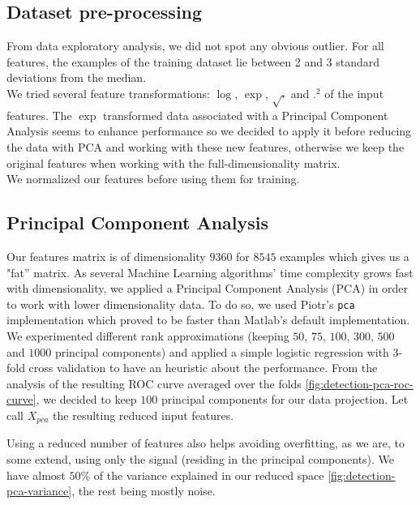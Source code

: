 \documentclass[10pt,a4paper]{article}
\begin{document}
  \subsection{Dataset pre-processing}
  From data exploratory analysis, we did not spot any obvious outlier. For all features, the examples of the training dataset lie between 2 and 3 standard deviations from the median. \\We tried several feature transformations: $\log$, $\exp$, $\sqrt{.}$ and $.^2$ of the input features. The $\exp$ transformed data associated with a Principal Component Analysis seems to enhance performance so we decided to apply it before reducing the data with PCA and working with these new features, otherwise we keep the original features when working with the full-dimensionality matrix. \\We normalized our features before using them for training.

  \subsection{Principal Component Analysis}
  Our features matrix is of dimensionality $9360$ for $8545$ examples which gives us a "fat'' matrix. As several Machine Learning algorithms' time complexity grows fast with dimensionality, we applied a Principal Component Analysis (PCA) in order to work with lower dimensionality data. To do so, we used Piotr's \texttt{pca} implementation which proved to be faster than Matlab's default implementation. We experimented different rank approximations (keeping $50$, $75$, $100$, $300$, $500$ and $1000$ principal components) and applied a simple logistic regression with 3-fold cross validation to have an heuristic about the performance. From the analysis of the resulting ROC curve averaged over the folds \ref{fig:detection-pca-roc-curve}, we decided to keep $100$ principal components for our data projection. Let call $X_{pca}$ the resulting reduced input features.

  Using a reduced number of features also helps avoiding overfitting, as we are, to some extend, using only the signal (residing in the principal components). We have almost $50\%$ of the variance explained in our reduced space \ref{fig:detection-pca-variance}, the rest being mostly noise.
\end{document}
